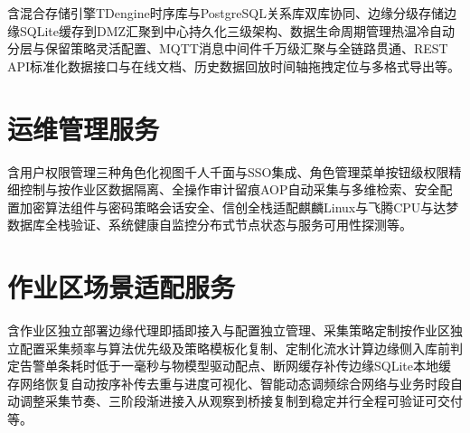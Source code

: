 \documentclass[11pt,a4paper]{ctexart}
\begin{document}
含混合存储引擎TDengine时序库与PostgreSQL关系库双库协同、边缘分级存储边缘SQLite缓存到DMZ汇聚到中心持久化三级架构、数据生命周期管理热温冷自动分层与保留策略灵活配置、MQTT消息中间件千万级汇聚与全链路贯通、REST API标准化数据接口与在线文档、历史数据回放时间轴拖拽定位与多格式导出等。

\section{运维管理服务}

含用户权限管理三种角色化视图千人千面与SSO集成、角色管理菜单按钮级权限精细控制与按作业区数据隔离、全操作审计留痕AOP自动采集与多维检索、安全配置加密算法组件与密码策略会话安全、信创全栈适配麒麟Linux与飞腾CPU与达梦数据库全栈验证、系统健康自监控分布式节点状态与服务可用性探测等。

\section{作业区场景适配服务}

含作业区独立部署边缘代理即插即接入与配置独立管理、采集策略定制按作业区独立配置采集频率与算法优先级及策略模板化复制、定制化流水计算边缘侧入库前判定告警单条耗时低于一毫秒与物模型驱动配点、断网缓存补传边缘SQLite本地缓存网络恢复自动按序补传去重与进度可视化、智能动态调频综合网络与业务时段自动调整采集节奏、三阶段渐进接入从观察到桥接复制到稳定并行全程可验证可交付等。
\end{document}
